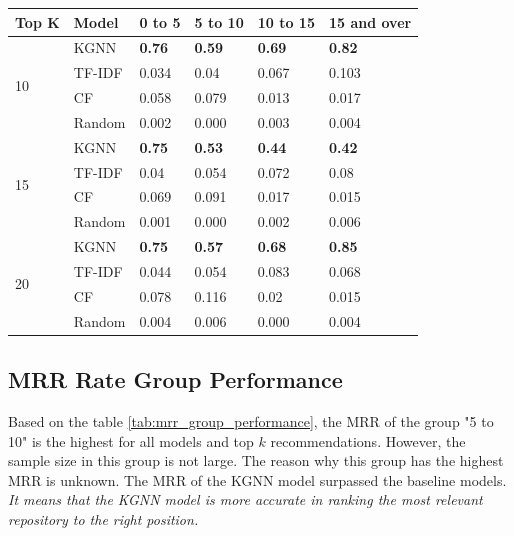 \documentclass[11pt,twoside]{report}
\begin{document}
\begin{center}
    \begin{tabular}{l | l | l | l | l | l}
    \hline
    Top K & Model & 0 to 5 & 5 to 10 & 10 to 15 & 15 and over \\
    \hline
    \multirow{4}{*}{10} 
    & KGNN & \textbf{0.76} & \textbf{0.59} & \textbf{0.69} & \textbf{0.82} \\
    & TF-IDF & 0.034 & 0.04 & 0.067 & 0.103 \\
    & CF & 0.058 & 0.079 & 0.013 & 0.017 \\
    & Random & 0.002 & 0.000 & 0.003 & 0.004 \\
    \hline
    \multirow{4}{*}{15}
    & KGNN & \textbf{0.75} & \textbf{0.53} & \textbf{0.44} & \textbf{0.42} \\
    & TF-IDF & 0.04 & 0.054 & 0.072 & 0.08 \\
    & CF & 0.069 & 0.091 & 0.017 & 0.015 \\
    & Random & 0.001 & 0.000 & 0.002 & 0.006 \\
    \hline
    \multirow{4}{*}{20}
    & KGNN & \textbf{0.75} & \textbf{0.57} & \textbf{0.68} & \textbf{0.85} \\
    & TF-IDF & 0.044 & 0.054 & 0.083 & 0.068 \\
    & CF & 0.078 & 0.116 & 0.02 & 0.015 \\
    & Random & 0.004 & 0.006 & 0.000 & 0.004 \\
    \end{tabular}
    \label{tab:hit_rate_group_performance}
\end{center}

\subsection{MRR Rate Group Performance}
Based on the table \ref{tab:mrr_group_performance}, the MRR of the group "5 to 10" is the highest for all models and top $k$ recommendations. However, the sample size in this group is not large. The reason why this group has the highest MRR is unknown. The MRR of the KGNN model surpassed the baseline models. \textit{It means that the KGNN model is more accurate in ranking the most relevant repository to the right position.}
\end{document}
